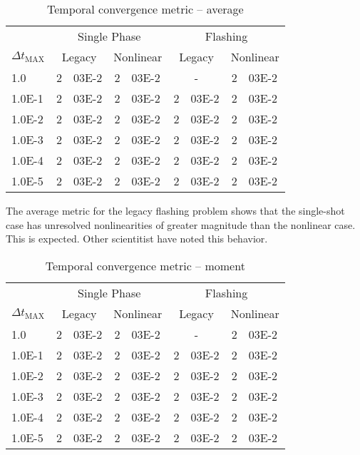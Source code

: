 \begin{table}[h!t]
\centering
\begin{tabular}{@{}l r@{.}l r@{.}l r@{.}l r@{.}l @{}}
\toprule
& \multicolumn{4}{c}{Single Phase} & \multicolumn{4}{c}{Flashing}  \\
$\Delta t_{\text{MAX}}$ & \multicolumn{2}{c}{Legacy} & \multicolumn{2}{c}{Nonlinear} & \multicolumn{2}{c}{Legacy}& \multicolumn{2}{c}{Nonlinear}  \\
\midrule
1.0    & 2&03E-2 & 2&03E-2 & \multicolumn{2}{c}{-} & 2&03E-2 \\
1.0E-1 & 2&03E-2 & 2&03E-2 & 2&03E-2 & 2&03E-2 \\
1.0E-2 & 2&03E-2 & 2&03E-2 & 2&03E-2 & 2&03E-2 \\
1.0E-3 & 2&03E-2 & 2&03E-2 & 2&03E-2 & 2&03E-2 \\
1.0E-4 & 2&03E-2 & 2&03E-2 & 2&03E-2 & 2&03E-2 \\
1.0E-5 & 2&03E-2 & 2&03E-2 & 2&03E-2 & 2&03E-2 \\
\bottomrule  
\end{tabular}
\caption{Temporal convergence metric -- average}
\label{tab:criteria_ave}
\end{table}

The average metric for the legacy flashing problem shows that the single-shot case has unresolved nonlinearities of greater magnitude than the nonlinear case.
This is expected.
Other scientitist have noted this behavior.


\begin{table}[h!t]
\centering
\begin{tabular}{@{}l r@{.}l r@{.}l r@{.}l r@{.}l @{}}
\toprule
& \multicolumn{4}{c}{Single Phase} & \multicolumn{4}{c}{Flashing}  \\
$\Delta t_{\text{MAX}}$ & \multicolumn{2}{c}{Legacy} & \multicolumn{2}{c}{Nonlinear} & \multicolumn{2}{c}{Legacy}& \multicolumn{2}{c}{Nonlinear}  \\
\midrule
1.0    & 2&03E-2 & 2&03E-2 & \multicolumn{2}{c}{-} & 2&03E-2 \\
1.0E-1 & 2&03E-2 & 2&03E-2 & 2&03E-2 & 2&03E-2 \\
1.0E-2 & 2&03E-2 & 2&03E-2 & 2&03E-2 & 2&03E-2 \\
1.0E-3 & 2&03E-2 & 2&03E-2 & 2&03E-2 & 2&03E-2 \\
1.0E-4 & 2&03E-2 & 2&03E-2 & 2&03E-2 & 2&03E-2 \\
1.0E-5 & 2&03E-2 & 2&03E-2 & 2&03E-2 & 2&03E-2 \\
\bottomrule  
\end{tabular}
\caption{Temporal convergence metric -- moment}
\label{tab:criteria_moment}
\end{table}

